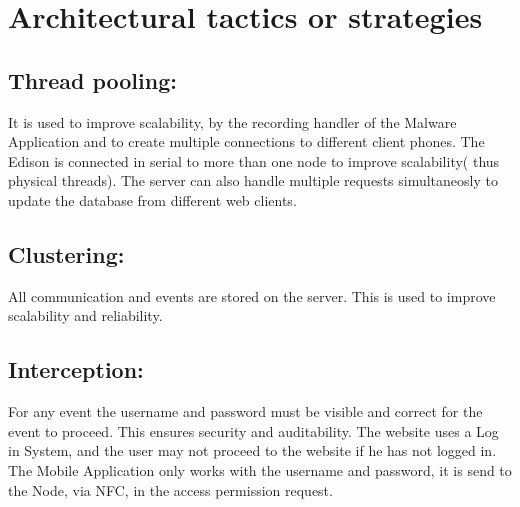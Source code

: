 \documentclass[a4paper,12pt,titlepage]{article}
\begin{document}
\newpage\section{Architectural tactics or strategies}
	\subsection{Thread pooling: }It is used to improve scalability, by the recording handler of the Malware Application and to create multiple connections to different client phones. The Edison is connected in serial to more than one node to improve scalability( thus physical threads). The server can also handle multiple requests simultaneosly to update the database from different web clients.
	\subsection{Clustering: } All communication and events are stored on the server. This is used to improve scalability and reliability. 
	\subsection{ Interception: }For any event the username and password must be visible and correct for the event to proceed. This ensures security and auditability. The website uses a Log in System, and the user may not proceed to the website if he has not logged in. The Mobile Application only works with the username and password, it is send to the Node, via NFC, in the access permission request. 







\end{document}

